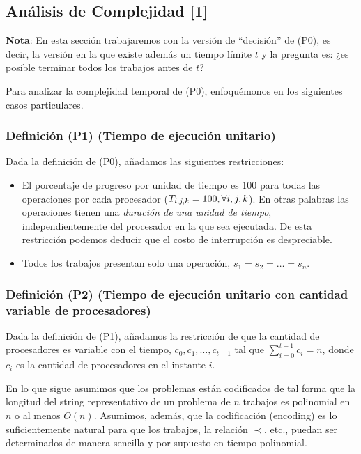 \documentclass[14pt]{extarticle}
\begin{document}
\subsection*{Análisis de Complejidad [1]}

\textbf{Nota}: En esta sección trabajaremos con la versión de ``decisión'' de (P0), es decir, la versión en la que existe además un tiempo límite $t$ y la pregunta es: ¿es posible terminar todos los trabajos antes de $t$?

Para analizar la complejidad temporal de (P0), enfoquémonos en los siguientes casos particulares.

\subsubsection*{Definición (P1) (Tiempo de ejecución unitario)}

Dada la definición de (P0), añadamos las siguientes restricciones:

\begin{itemize}
    \item El porcentaje de progreso por unidad de tiempo es 100 para todas las operaciones por cada procesador ($T_{i, j, k} = 100, \space \forall i, j, k$). En otras palabras las operaciones tienen una \textit{duración de una unidad de tiempo}, independientemente del procesador en la que sea ejecutada. De esta restricción podemos deducir que el costo de interrupción es despreciable.
    \item Todos los trabajos presentan solo una operación, $s_1 = s_2 = \ldots = s_n$.
\end{itemize}

\subsubsection*{Definición (P2) (Tiempo de ejecución unitario con cantidad variable de procesadores)}

Dada la definición de (P1), añadamos la restricción de que la cantidad de procesadores es variable con el tiempo, $c_0, c_1, \ldots, c_{t-1}$ tal que $\sum_{i = 0}^{t-1} c_i = n$, donde $c_i$ es la cantidad de procesadores en el instante $i$.

En lo que sigue asumimos que los problemas están codificados de tal forma que la longitud del string representativo de un problema de $n$ trabajos es polinomial en $n$ o al menos $O(n)$. Asumimos, además, que la codificación (encoding) es lo suficientemente natural para que los trabajos, la relación $\prec$, etc., puedan ser determinados de manera sencilla y por supuesto en tiempo polinomial.
\end{document}
